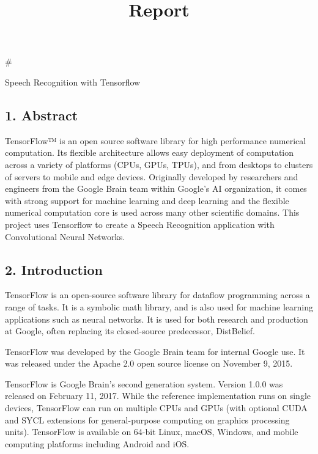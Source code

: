 \documentclass[11pt]{article}
\title{Report}
\begin{document}
    
    
    \maketitle
    
    

    
    \#

Speech Recognition with Tensorflow

    \subsection{1. Abstract}\label{abstract}

    TensorFlow™ is an open source software library for high performance
numerical computation. Its flexible architecture allows easy deployment
of computation across a variety of platforms (CPUs, GPUs, TPUs), and
from desktops to clusters of servers to mobile and edge devices.
Originally developed by researchers and engineers from the Google Brain
team within Google's AI organization, it comes with strong support for
machine learning and deep learning and the flexible numerical
computation core is used across many other scientific domains. This
project uses Tensorflow to create a Speech Recognition application with
Convolutional Neural Networks.

    \subsection{2. Introduction}\label{introduction}

    TensorFlow is an open-source software library for dataflow programming
across a range of tasks. It is a symbolic math library, and is also used
for machine learning applications such as neural networks. It is used
for both research and production at Google,‍ often replacing its
closed-source predecessor, DistBelief.

TensorFlow was developed by the Google Brain team for internal Google
use. It was released under the Apache 2.0 open source license on
November 9, 2015.

TensorFlow is Google Brain's second generation system. Version 1.0.0 was
released on February 11, 2017. While the reference implementation runs
on single devices, TensorFlow can run on multiple CPUs and GPUs (with
optional CUDA and SYCL extensions for general-purpose computing on
graphics processing units). TensorFlow is available on 64-bit Linux,
macOS, Windows, and mobile computing platforms including Android and
iOS.
\end{document}
